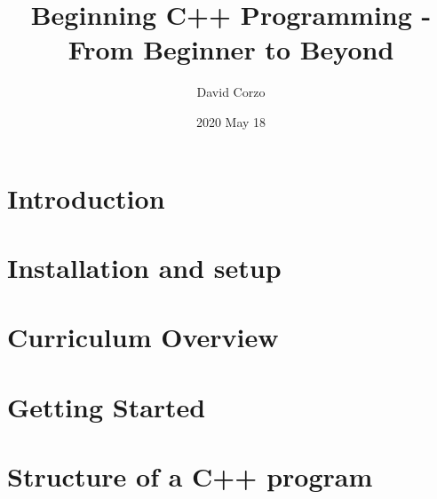 \documentclass[openany]{book}
\title{Beginning C++ Programming - From Beginner to Beyond}
\date{2020 May 18} %
\author{David Corzo}
\begin{document}
\maketitle
\tableofcontents

\chapter{Introduction}


\chapter{Installation and setup}


\chapter{Curriculum Overview}


\chapter{Getting Started}


\chapter{Structure of a C++ program}


% 


% 

% 

% 
\end{document}
